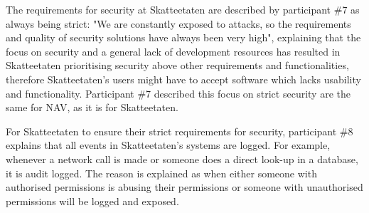 
The requirements for security at Skatteetaten are described by participant \#7 as always being strict: "We are constantly exposed to attacks, so the requirements and quality of security solutions have always been very high", explaining that the focus on security and a general lack of development resources has resulted in Skatteetaten prioritising security above other requirements and functionalities, therefore Skatteetaten's users might have to accept software which lacks usability and functionality. Participant \#7 described this focus on strict security are the same for NAV, as it is for Skatteetaten.


For Skatteetaten to ensure their strict requirements for security, participant \#8 explains that all events in Skatteetaten's systems are logged. For example, whenever a network call is made or someone does a direct look-up in a database, it is audit logged. The reason is explained as when either someone with authorised permissions is abusing their permissions or someone with unauthorised permissions will be logged and exposed.


